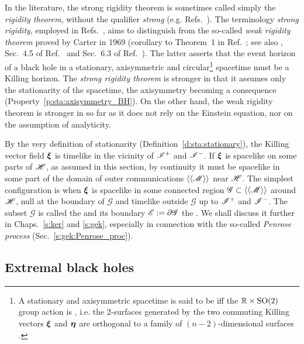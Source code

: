 In the literature, the strong rigidity theorem is sometimes called
simply the \emph{rigidity theorem}, without the qualifier \emph{strong}
(e.g. Refs.~\cite{Choqu09,HollaI12}).
The terminology \emph{strong rigidity}, employed in Refs.~\cite{Carte99,ChrusLH12,Heusl96},
aims to distinguish from the so-called
\emph{weak rigidity theorem}
proved by Carter in 1969 (corollary to Theorem~1 in Ref.~\cite{Carte69}; see also \cite{Carte72}, Sec.~4.5 of Ref.~\cite{Carte87} and Sec.~6.3 of Ref.~\cite{Heusl96}). The latter asserts that the event horizon of a black hole in a stationary, axisymmetric
and circular\footnote{A stationary and axisymmetric spacetime is said to be  iff the $\mathbb{R}\times\mathrm{SO}(2)$ group action
is , i.e. the 2-surfaces generated by the two commuting
Killing vectors $\bm{\xi}$ and $\bm{\eta}$ are orthogonal to a family of $(n-2)$-dimensional surfaces \cite{Carte69}.}
spacetime must be a Killing horizon. The \emph{strong rigidity theorem} is
stronger in that it assumes only the stationarity of the spacetime, the axisymmetry
becoming a consequence (Property~\ref{p:sta:axisymmetry_BH}). On the other hand,
the weak rigidity theorem is stronger in so far as it does not rely on
the Einstein equation, nor on the assumption of analyticity.

By the very definition of stationarity (Definition~\ref{d:sta:stationary}),
the Killing vector field $\bm{\xi}$ is
timelike in the vicinity of $\mathscr{I}^+$ and $\mathscr{I}^-$. If $\bm{\xi}$ is spacelike
on some parts of $\mathscr{H}$, as assumed in this section, by continuity it must be spacelike
in some part of the domain of outer communications $\langle\langle \mathscr{M}\rangle\rangle$
near $\mathscr{H}$. The simplest configuration is when
$\bm{\xi}$ is spacelike in some connected region $\mathscr{G}\subset \langle\langle \mathscr{M}\rangle\rangle$
around $\mathscr{H}$, null at the boundary of $\mathscr{G}$ and timelike outside $\mathscr{G}$
up to $\mathscr{I}^+$ and $\mathscr{I}^-$. The subset $\mathscr{G}$ is
called the  and its boundary $\mathscr{E}:=\partial\mathscr{G}$
the . We shall discuss it further in Chaps.~\ref{s:ker} and \ref{s:gek},
especially in connection with the so-called \emph{Penrose process}
(Sec.~\ref{s:gek:Penrose_proc}).

\subsection{Extremal black holes} \label{s:sta:extremal_BH}

